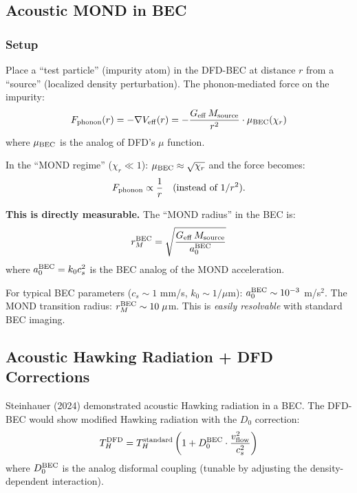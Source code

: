 \documentclass[11pt,a4paper]{article}
\begin{document}
\subsection{Acoustic MOND in BEC}

\subsubsection{Setup}

Place a ``test particle'' (impurity atom) in the DFD-BEC at distance $r$ from a ``source'' (localized density perturbation). The phonon-mediated force on the impurity:
\begin{equation}
F_{\rm phonon}(r) = -\nabla V_{\rm eff}(r) = -\frac{G_{\rm eff}\,M_{\rm source}}{r^2}\cdot\mu_{\rm BEC}(\chi_r)
\end{equation}
where $\mu_{\rm BEC}$ is the analog of DFD's $\mu$ function.

In the ``MOND regime'' ($\chi_r \ll 1$): $\mu_{\rm BEC} \approx \sqrt{\chi_r}$ and the force becomes:
\begin{equation}
F_{\rm phonon} \propto \frac{1}{r} \quad \text{(instead of $1/r^2$)}.
\end{equation}

\textbf{This is directly measurable.} The ``MOND radius'' in the BEC is:
\begin{equation}
r_M^{\rm BEC} = \sqrt{\frac{G_{\rm eff}\,M_{\rm source}}{a_0^{\rm BEC}}}
\end{equation}
where $a_0^{\rm BEC} = k_0 c_s^2$ is the BEC analog of the MOND acceleration.

For typical BEC parameters ($c_s \sim 1$ mm/s, $k_0 \sim 1/\mu$m): $a_0^{\rm BEC} \sim 10^{-3}$ m/s$^2$. The MOND transition radius: $r_M^{\rm BEC} \sim 10\;\mu$m. This is \emph{easily resolvable} with standard BEC imaging.

\subsection{Acoustic Hawking Radiation + DFD Corrections}

Steinhauer (2024) demonstrated acoustic Hawking radiation in a BEC. The DFD-BEC would show modified Hawking radiation with the $D_0$ correction:
\begin{equation}
T_H^{\rm DFD} = T_H^{\rm standard}\left(1 + D_0^{\rm BEC}\cdot\frac{v_{\rm flow}^2}{c_s^2}\right)
\end{equation}
where $D_0^{\rm BEC}$ is the analog disformal coupling (tunable by adjusting the density-dependent interaction).
\end{document}
